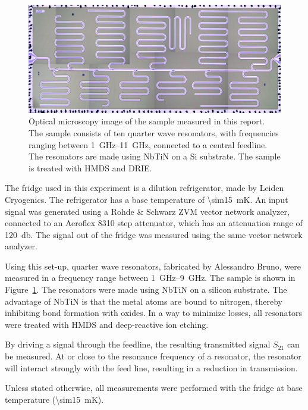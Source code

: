   \begin{figure}
      \begin{center}
          \includegraphics[width=\textwidth]{Figures/DRIE/All_set4.png}
      \end{center}
      \caption{Optical microscopy image of the sample measured in this report. The sample consists of ten quarter wave resonators, with frequencies ranging between \SIrange{1}{11}{\giga \hertz}, connected to a central feedline. The resonators are made using NbTiN on a Si substrate. The sample is treated with HMDS and DRIE.}
      \label{fig:set4}
  \end{figure}

  The fridge used in this experiment is a dilution refrigerator, made by Leiden Cryogenics. The refrigerator has a base temperature of \SI{\sim15}{\milli \kelvin}. An input signal was generated using a Rohde \& Schwarz ZVM vector network analyzer, connected to an Aeroflex 8310 step attenuator, which has an attenuation range of \SI{120}{\decibel}. The signal out of the fridge was measured using the same vector network analyzer.

  Using this set-up, quarter wave resonators, fabricated by Alessandro Bruno, were measured in a frequency range between \SIrange{1}{9}{\giga \hertz}. The sample is shown in Figure~\ref{fig:set4}. The resonators were made using NbTiN on a silicon substrate. The advantage of NbTiN is that the metal atoms are bound to nitrogen, thereby inhibiting bond formation with oxides. In a way to minimize losses, all resonators were treated with HMDS and deep-reactive ion etching.

  By driving a signal through the feedline, the resulting transmitted signal $S_{21}$ can be measured. At or close to the resonance frequency of a resonator, the resonator will interact strongly with the feed line, resulting in a reduction in transmission.

  Unless stated otherwise, all measurements were performed with the fridge at base temperature (\SI{\sim15}{\milli \kelvin}).

